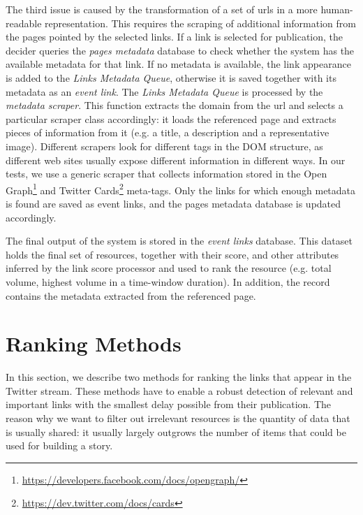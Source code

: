 \documentclass{sig-alternate}
\begin{document}
The third issue is caused by the transformation of a set of urls in a more human-readable representation. This requires the scraping of additional information from the pages pointed by the selected links. If a link is selected for publication, the decider queries the \emph{pages metadata} database to check whether the system has the available metadata for that link. If no metadata is available, the link appearance is added to the \emph{Links Metadata Queue}, otherwise it is saved together with its metadata as an \emph{event link}. The \emph{Links Metadata Queue} is processed by the \emph{metadata scraper}. This function extracts the domain from the url and selects a particular scraper class accordingly: it loads the referenced page and extracts pieces of information from it (e.g. a title, a description and a representative image). Different scrapers look for different tags in the DOM structure, as different web sites usually expose different information in different ways. In our tests, we use a generic scraper that collects information stored in the Open Graph\footnote{\url{https://developers.facebook.com/docs/opengraph/}} and Twitter Cards\footnote{\url{https://dev.twitter.com/docs/cards}} meta-tags. Only the links for which enough metadata is found are saved as event links, and the pages metadata database is updated accordingly.

The final output of the system is stored in the \emph{event links} database. This dataset holds the final set of resources, together with their score, and other attributes inferred by the link score processor and used to rank the resource (e.g. total volume, highest volume in a time-window duration). In addition, the record contains the metadata extracted from the referenced page.


\section{Ranking Methods}
\label{sec:ranking_methods}
In this section, we describe two methods for ranking the links that appear in the Twitter stream. These methods have to enable a robust detection of relevant and important links with the smallest delay possible from their publication. The reason why we want to filter out irrelevant resources is the quantity of data that is usually shared: it usually largely outgrows the number of items that could be used for building a story.
\end{document}
